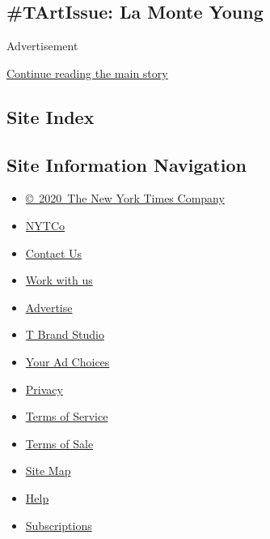 \hypertarget{tartissue-la-monte-young}{%
\subsection{\#TArtIssue: La Monte
Young}\label{tartissue-la-monte-young}}

Advertisement

\protect\hyperlink{after-bottom}{Continue reading the main story}

\hypertarget{site-index}{%
\subsection{Site Index}\label{site-index}}

\hypertarget{site-information-navigation}{%
\subsection{Site Information
Navigation}\label{site-information-navigation}}

\begin{itemize}
\tightlist
\item
  \href{https://help.nytimes.com/hc/en-us/articles/115014792127-Copyright-notice}{©~2020~The
  New York Times Company}
\end{itemize}

\begin{itemize}
\tightlist
\item
  \href{https://www.nytco.com/}{NYTCo}
\item
  \href{https://help.nytimes.com/hc/en-us/articles/115015385887-Contact-Us}{Contact
  Us}
\item
  \href{https://www.nytco.com/careers/}{Work with us}
\item
  \href{https://nytmediakit.com/}{Advertise}
\item
  \href{http://www.tbrandstudio.com/}{T Brand Studio}
\item
  \href{https://www.nytimes.com/privacy/cookie-policy\#how-do-i-manage-trackers}{Your
  Ad Choices}
\item
  \href{https://www.nytimes.com/privacy}{Privacy}
\item
  \href{https://help.nytimes.com/hc/en-us/articles/115014893428-Terms-of-service}{Terms
  of Service}
\item
  \href{https://help.nytimes.com/hc/en-us/articles/115014893968-Terms-of-sale}{Terms
  of Sale}
\item
  \href{https://spiderbites.nytimes.com}{Site Map}
\item
  \href{https://help.nytimes.com/hc/en-us}{Help}
\item
  \href{https://www.nytimes.com/subscription?campaignId=37WXW}{Subscriptions}
\end{itemize}
